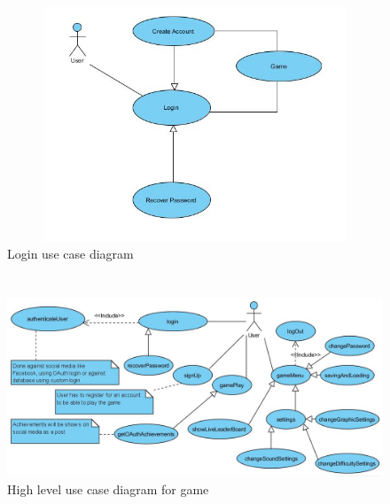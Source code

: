 \documentclass[letterpaper]{article}
\begin{document}
		\begin{figure}[H]
		\centering
		\includegraphics[width=180mm, height=70mm]{UML_Diagram/Use_Case/login_simple}
		\caption{Login use case diagram}
		\label{overflow}
		\end{figure}		
				
		\vspace{0.2in}
		
		\section*{\colorbox{black}{}} 
				
		\begin{figure}[ht!]
		\centering
		\includegraphics[width=180mm]{UML_Diagram/Use_Case/high_level_use_case_diagram}
		\caption{High level use case diagram for game}
		\label{overflow}
		\end{figure}
		
		\vspace{0.2in}
		
\end{document}

